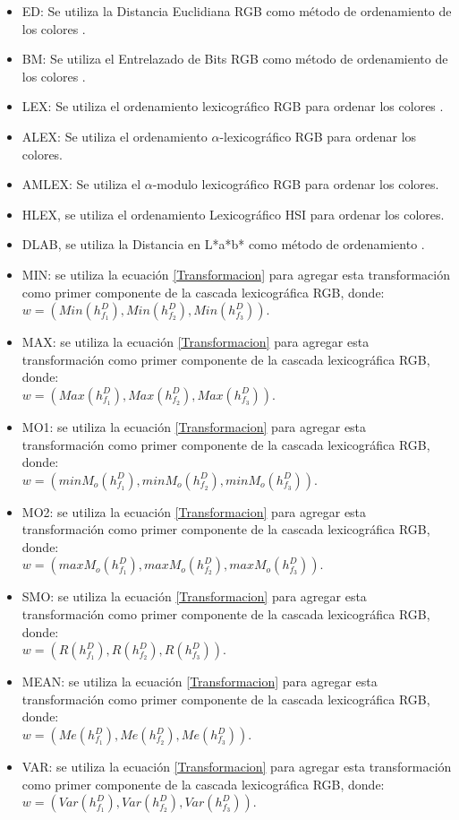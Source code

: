 \begin{itemize}
	\item ED: Se utiliza la Distancia Euclidiana  RGB como m\'etodo de ordenamiento de los colores \cite{ortiz2002procesamiento}.
	\item BM: Se utiliza el Entrelazado de Bits RGB como m\'etodo de ordenamiento de los colores \cite{chanussot1997bit}.
	\item LEX: Se utiliza el ordenamiento lexicogr\'afico RGB para ordenar los colores .
	\item ALEX: Se utiliza el ordenamiento $\alpha$-lexicogr\'afico RGB \cite{zamora2001comparative} para ordenar los colores.
	\item AMLEX: Se utiliza el  $\alpha$-modulo lexicogr\'afico RGB \cite{angulo2003morphological} para ordenar los colores.
	\item HLEX, se utiliza el ordenamiento Lexicográfico HSI para ordenar los colores.
	\item DLAB, se utiliza la Distancia en L*a*b* como m\'etodo de ordenamiento \cite{ortiz2002procesamiento}.
	\item MIN: se utiliza la ecuaci\'on \ref{Transformacion} para agregar esta transformaci\'on como primer componente de la cascada lexicogr\'afica RGB, donde:\\ 
$w = (Min(h_{f_1}^D), Min(h_{f_2}^D),Min(h_{f_3}^D))$.
	\item MAX: se utiliza la ecuaci\'on \ref{Transformacion} para agregar esta transformaci\'on como primer componente de la cascada lexicogr\'afica RGB, donde:\\ 
$w = (Max(h_{f_1}^D), Max(h_{f_2}^D),Max(h_{f_3}^D))$.
	\item MO1: se utiliza la ecuaci\'on \ref{Transformacion} para agregar esta transformaci\'on como primer componente de la cascada lexicogr\'afica RGB, donde:\\ 
$w = (minM_o(h_{f_1}^D), minM_o(h_{f_2}^D), minM_o(h_{f_3}^D))$.
	\item MO2: se utiliza la ecuaci\'on \ref{Transformacion} para agregar esta transformaci\'on como primer componente de la cascada lexicogr\'afica RGB, donde:\\ 
$w = (maxM_o(h_{f_1}^D), maxM_o(h_{f_2}^D), maxM_o(h_{f_3}^D))$.
	\item SMO: se utiliza la ecuaci\'on \ref{Transformacion} para agregar esta transformaci\'on como primer componente de la cascada lexicogr\'afica RGB, donde:\\ 
$w = (R(h_{f_1}^D), R(h_{f_2}^D), R(h_{f_3}^D))$.
	\item MEAN: se utiliza la ecuaci\'on \ref{Transformacion} para agregar esta transformaci\'on como primer componente de la cascada lexicogr\'afica RGB, donde:\\ 
$w = (Me(h_{f_1}^D), Me(h_{f_2}^D), Me(h_{f_3}^D))$.
	\item VAR: se utiliza la ecuaci\'on \ref{Transformacion} para agregar esta transformaci\'on como primer componente de la cascada lexicogr\'afica RGB, donde:\\ 
$w = (Var(h_{f_1}^D), Var(h_{f_2}^D), Var(h_{f_3}^D))$.
\end{itemize}

